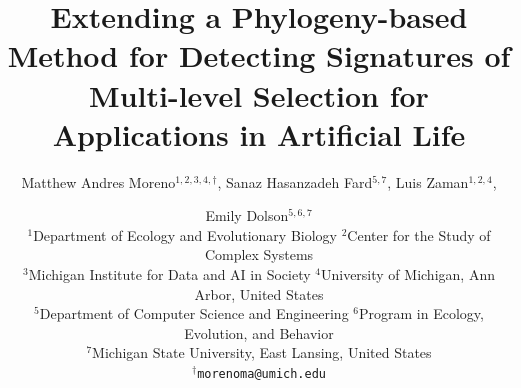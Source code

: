 \title{Extending a Phylogeny-based Method for Detecting Signatures of Multi-level Selection for Applications in Artificial Life}


\author{
    Matthew Andres Moreno$^{1,2,3,4,\dagger}$,
    Sanaz Hasanzadeh Fard$^{5,7}$,
    Luis Zaman$^{1,2,4}$, \and
    Emily Dolson$^{5,6,7}$%
    \mbox{}\\
    $^1$Department of Ecology and Evolutionary Biology
    $^2$Center for the Study of Complex Systems\\
    $^3$Michigan Institute for Data and AI in Society
    $^4$University of Michigan, Ann Arbor, United States\\
    $^5$Department of Computer Science and Engineering
    $^6$Program in Ecology, Evolution, and Behavior\\
    $^7$Michigan State University, East Lansing, United States\\
    $^\dagger$\texttt{morenoma@umich.edu}
}

\maketitle
